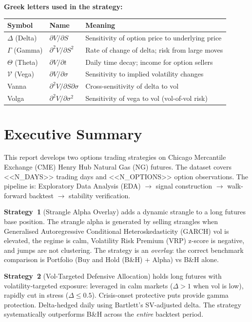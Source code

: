 \documentclass[11pt,a4paper]{article}
\begin{document}
\vspace{1em}

\noindent\textbf{Greek letters used in the strategy:}

\begin{tabularx}{\textwidth}{llX}
\toprule
Symbol & Name & Meaning \\
\midrule
$\Delta$ (Delta) & $\partial V / \partial S$ & Sensitivity of option price to underlying price \\
$\Gamma$ (Gamma) & $\partial^2 V / \partial S^2$ & Rate of change of delta; risk from large moves \\
$\Theta$ (Theta) & $\partial V / \partial t$ & Daily time decay; income for option sellers \\
$\mathcal{V}$ (Vega) & $\partial V / \partial \sigma$ & Sensitivity to implied volatility changes \\
Vanna & $\partial^2 V / \partial S \partial \sigma$ & Cross-sensitivity of delta to vol \\
Volga & $\partial^2 V / \partial \sigma^2$ & Sensitivity of vega to vol (vol-of-vol risk) \\
\bottomrule
\end{tabularx}

\newpage

\section{Executive Summary}

This report develops two options trading strategies on Chicago Mercantile Exchange (CME) Henry Hub Natural Gas (NG) futures. The dataset covers <<N_DAYS>> trading days and <<N_OPTIONS>> option observations. The pipeline is: Exploratory Data Analysis (EDA) $\to$ signal construction $\to$ walk-forward backtest $\to$ stability verification.

\textbf{Strategy~1} (Strangle Alpha Overlay) adds a dynamic strangle to a long futures base position. The strangle alpha is generated by selling strangles when Generalised Autoregressive Conditional Heteroskedasticity (GARCH) vol is elevated, the regime is calm, Volatility Risk Premium (VRP) z-score is negative, and jumps are not clustering. The strategy is an \textit{overlay}: the correct benchmark comparison is Portfolio (Buy and Hold (B\&H) + Alpha) vs B\&H alone.

\textbf{Strategy~2} (Vol-Targeted Defensive Allocation) holds long futures with volatility-targeted exposure: leveraged in calm markets ($\Delta > 1$ when vol is low), rapidly cut in stress ($\Delta \leq 0.5$). Crisis-onset protective puts provide gamma protection. Delta-hedged daily using Bartlett's SV-adjusted delta. The strategy systematically outperforms B\&H across the \emph{entire} backtest period.
\end{document}
